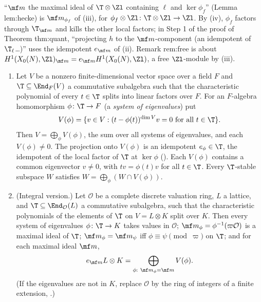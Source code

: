 \begin{paperlink}\label{pl:modules:tm}
``$\mf m$ the maximal ideal of $\T\otimes\Zl$ containing $\ell$ and $\ker\phi_f$'' (Lemma lem:hecke) is $\mf m_{\phi_f}$ of
(iii), for $\phi_f\otimes\Zl\colon\T\otimes\Zl\to\Zl$. By (iv), $\phi_f$ factors through
$\T_{\mf m}$ and kills the other local factors; in Step 1 of the proof of Theorem thm:quant, ``projecting $h$ to the $\mf m$-component (an idempotent of
$\T_\ell$\dots)'' uses the idempotent $e_{\mf m}$ of (ii). Remark rem:free is about $H^1(X_0(N),\Zl)_{\mf m}=e_{\mf m}H^1(X_0(N),\Zl)$, a free $\Zl$-module by (iii).
\end{paperlink}

\begin{theorem}\label{thm:modules:generalised-eigenspaces}
\begin{enumerate}[label=(\roman*)]
\item Let $V$ be a nonzero finite-dimensional vector space over a field $F$ and $\T\subseteq\End_F(V)$ a commutative subalgebra such that the characteristic
polynomial of every $t\in\T$ splits into linear factors over $F$. For an $F$-algebra homomorphism $\phi\colon\T\to F$ (a \emph{system of eigenvalues}) put
\[
V(\phi)=\{v\in V:(t-\phi(t))^{\dim V}v=0\text{ for all }t\in\T\}.
\]
Then $V=\bigoplus_\phi V(\phi)$, the sum over all systems of eigenvalues, and each $V(\phi)\ne0$. The projection onto $V(\phi)$ is an idempotent $e_\phi\in\T$, the
idempotent of the local factor of $\T$ at $\ker\phi$ (). Each $V(\phi)$ contains a common eigenvector $v\ne0$, with $tv=\phi(t)v$ for
all $t\in\T$. Every $\T$-stable subspace $W$ satisfies $W=\bigoplus_\phi(W\cap V(\phi))$.
\item (Integral version.) Let $\mathcal O$ be a complete discrete valuation ring, $L$ a lattice, and $\T\subseteq\End_{\mathcal O}(L)$ a commutative subalgebra, such that the
characteristic polynomials of the elements of $\T$ on $V=L\otimes K$ split over $K$. Then every system of eigenvalues $\phi\colon\T\to K$ takes values in $\mathcal O$;
$\mf m_\phi=\phi^{-1}(\varpi\mathcal O)$ is a maximal ideal of $\T$; $\mf m_\phi=\mf m_\psi$ iff $\phi\equiv\psi\pmod\varpi$ on $\T$; and for each maximal ideal $\mf m$,
\[
e_{\mf m}L\otimes K=\bigoplus_{\phi:\ \mf m_\phi=\mf m}V(\phi).
\]
(If the eigenvalues are not in $K$, replace $\mathcal O$ by the ring of integers of a finite extension, .)
\end{enumerate}
\end{theorem}

